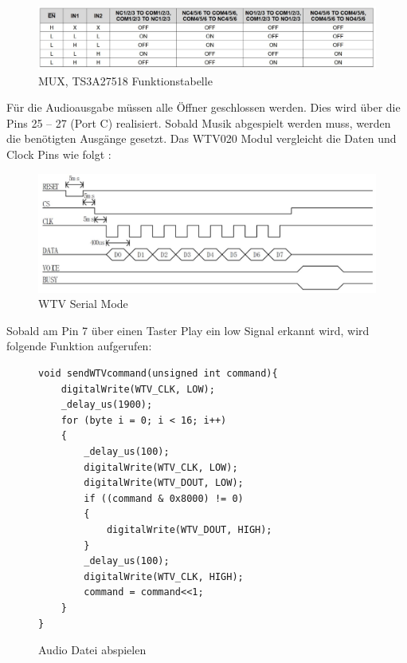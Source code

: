 \begin{figure}[h]
	\centering
	\includegraphics[width=15cm]{Bilder/MuxTab.jpg}
	\caption{MUX, TS3A27518 Funktionstabelle}
	\label{MUX-Tabelle}
\end{figure}

Für die Audioausgabe müssen alle Öffner geschlossen werden. Dies wird über die Pins 25 – 27 (Port C) realisiert. Sobald Musik abgespielt werden muss, werden die benötigten Ausgänge gesetzt. Das  WTV020 Modul vergleicht die Daten und Clock Pins wie folgt :
\begin{figure}[h]
	\centering
	\includegraphics[width=15cm]{Bilder/WTV-Serial-Mode.JPG}
	\caption{WTV Serial Mode}
	\label{WTV-Serial}
\end{figure}
\newpage
Sobald am Pin 7 über einen Taster Play ein low Signal erkannt wird, wird folgende Funktion aufgerufen:

\begin{figure}[h]
	\begin{verbatim}
void sendWTVcommand(unsigned int command){
	digitalWrite(WTV_CLK, LOW);
	_delay_us(1900);
	for (byte i = 0; i < 16; i++)
	{
		_delay_us(100);
		digitalWrite(WTV_CLK, LOW);
		digitalWrite(WTV_DOUT, LOW);
		if ((command & 0x8000) != 0)
		{
			digitalWrite(WTV_DOUT, HIGH);
		}
		_delay_us(100);
		digitalWrite(WTV_CLK, HIGH);
		command = command<<1;
	}
}
	\end{verbatim}
	\caption{Audio Datei abspielen }
	\label{WTV-Play}
\end{figure}


